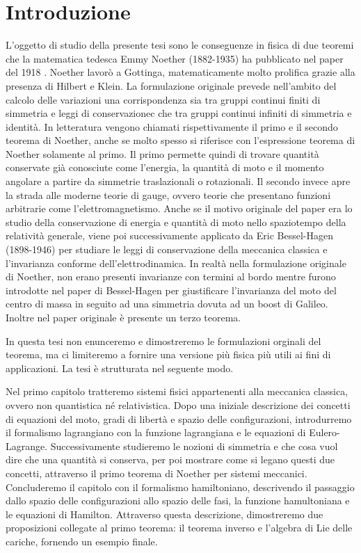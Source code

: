 \chapter*{Introduzione}

    L'oggetto di studio della presente tesi sono le conseguenze in fisica di due teoremi che la matematica tedesca Emmy Noether (1882-1935) ha pubblicato nel paper del 1918 \cite{noether}. Noether lavorò a Gottinga, matematicamente molto prolifica grazie alla presenza di Hilbert e Klein. La formulazione originale prevede nell'ambito del calcolo delle variazioni una corrispondenza sia tra gruppi continui finiti di simmetria e leggi di conservazionec che tra gruppi continui infiniti di simmetria e identità. In letteratura vengono chiamati rispettivamente il primo e il secondo teorema di Noether, anche se molto spesso si riferisce con l'espressione teorema di Noether solamente al primo. Il primo permette quindi di trovare quantità conservate già conosciute come l'energia, la quantità di moto e il momento angolare a partire da simmetrie traslazionali o rotazionali. Il secondo invece apre la strada alle moderne teorie di gauge, ovvero teorie che presentano funzioni arbitrarie come l'elettromagnetismo. Anche se il motivo originale del paper era lo studio della conservazione di energia e quantità di moto nello spaziotempo della relatività generale, viene poi successivamente applicato da Eric Bessel-Hagen (1898-1946) per studiare le leggi di conservazione della meccanica classica e l'invarianza conforme dell'elettrodinamica. In realtà nella formulazione originale di Noether, non erano presenti invarianze con termini al bordo mentre furono introdotte nel paper di Bessel-Hagen per giustificare l'invarianza del moto del centro di massa in seguito ad una simmetria dovuta ad un boost di Galileo. Inoltre nel paper originale è presente un terzo teorema.

    In questa tesi non enunceremo e dimostreremo le formulazioni orginali del teorema, ma ci limiteremo a fornire una versione più fisica più utili ai fini di applicazioni. La tesi è strutturata nel seguente modo. 
    
    Nel primo capitolo tratteremo sistemi fisici appartenenti alla meccanica classica, ovvero non quantistica né relativistica. Dopo una iniziale descrizione dei concetti di equazioni del moto, gradi di libertà e spazio delle configurazioni, introdurremo il formalismo lagrangiano con la funzione lagrangiana e le equazioni di Eulero-Lagrange. Successivamente studieremo le nozioni di simmetria e che cosa vuol dire che una quantità si conserva, per poi mostrare come si legano questi due concetti, attraverso il primo teorema di Noether per sistemi meccanici. Concluderemo il capitolo con il formalismo hamiltoniano, descrivendo il passaggio dallo spazio delle configurazioni allo spazio delle fasi, la funzione hamultoniana e le equazioni di Hamilton. Attraverso questa descrizione, dimostreremo due proposizioni collegate al primo teorema: il teorema inverso e l'algebra di Lie delle cariche, fornendo un esempio finale.

